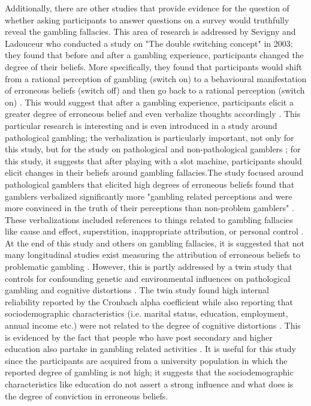 \documentclass[twoside,twocolumn]{article}
\begin{document}
Additionally, there are other studies that provide evidence for the question of whether asking participants to answer questions on a survey would truthfully reveal the gambling fallacies. This area of research is addressed by Sevigny and Ladouceur who conducted a study on "The double switching concept" in 2003; they found that before and after a gambling experience, participants changed the degree of their beliefs. More specifically, they found that participants would shift from a rational perception of gambling (switch on) to a behavioural manifestation of erroneous beliefs (switch off) and then go back to a rational perception (switch on) \cite{sevigny:2003}. This would suggest that after a gambling experience, participants elicit a greater degree of erroneous belief and even verbalize thoughts accordingly \cite{sevigny:2003}. This particular research is interesting and is even introduced in a study around pathological gambling; the verbalization is particularly important, not only for this study, but for the study on pathological and non-pathological gamblers \cite{Ladouceur:2004}; for this study, it suggests that after playing with a slot machine, participants should elicit changes in their beliefs around gambling fallacies.The study focused around pathological gamblers that elicited high degrees of erroneous beliefs found that gamblers verbalized significantly more "gambling related perceptions and were more convinced in the truth of their perceptions than non-problem gamblers" \cite{Ladouceur:2004}. These verbalizations included references to things related to gambling fallacies like cause and effect, superstition, inappropriate attribution, or personal control \cite{Ladouceur:2004}. At the end of this study and others on gambling fallacies, it is suggested that not many longitudinal studies exist measuring the attribution of erroneous beliefs to problematic gambling \cite{Leonard:2015, Ladouceur:2004, raylu:2004}. However, this is partly addressed by a twin study that controls for confounding genetic and environmental influences on pathological gambling and cognitive distortions \cite{xian:2008}. The twin study found high internal reliability reported by the Cronbach alpha coefficient while also reporting that sociodemographic characteristics (i.e. marital status, education, employment, annual income etc.) were not related to the degree of cognitive distortions \cite{xian:2008, cronbach}. This is evidenced by the fact that people who have post secondary and higher education also partake in gambling related activities \cite{bclc}. It is useful for this study since the participants are acquired from a university population in which the reported degree of gambling is not high; it suggests that the sociodemographic characteristics like education do not assert a strong influence and what does is the degree of conviction in erroneous beliefs.
\end{document}
